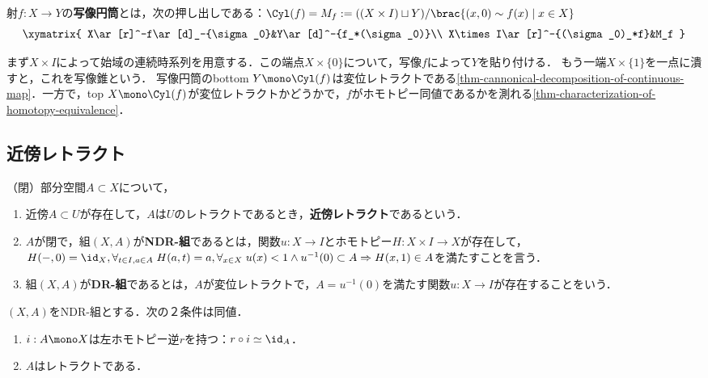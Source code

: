 \documentclass[uplatex, dvipdfmx]{jsreport}
\begin{document}
\begin{definition}
    射$f:X\to Y$の\textbf{写像円筒}とは，次の押し出しである：$\Cyl(f)=M_f:=((X\times I)\sqcup Y)/\brac{(x,0)\sim f(x)\mid x\in X}$
    \[\xymatrix{
        X\ar[r]^-f\ar[d]_-{\sigma_0}&Y\ar[d]^-{f_*(\sigma_0)}\\
        X\times I\ar[r]^-{(\sigma_0)_*f}&M_f
    }\]
\end{definition}
\begin{remarks}
    まず$X\times I$によって始域の連続時系列を用意する．この端点$X\times\{0\}$について，写像$f$によって$Y$を貼り付ける．
    もう一端$X\times\{1\}$を一点に潰すと，これを写像錐という．
    写像円筒のbottom $Y\mono\Cyl(f)$は変位レトラクトである\ref{thm-cannonical-decomposition-of-continuous-map}．一方で，top $X\mono\Cyl(f)$が変位レトラクトかどうかで，$f$がホモトピー同値であるかを測れる\ref{thm-characterization-of-homotopy-equivalence}．
\end{remarks}

\subsection{近傍レトラクト}

\begin{definition}
    （閉）部分空間$A\subset X$について，
    \begin{enumerate}
        \item 近傍$A\subset U$が存在して，$A$は$U$のレトラクトであるとき，\textbf{近傍レトラクト}であるという．
        \item $A$が閉で，組$(X,A)$が\textbf{NDR-組}であるとは，関数$u:X\to I$とホモトピー$H:X\times I\to X$が存在して，$H(-,0)=\id_X,\forall_{t\in I,a\in A}\;H(a,t)=a,\forall_{x\in X}\;u(x)<1\land u^{-1}(0)\subset A\Rightarrow H(x,1)\in A$を満たすことを言う．
        \item 組$(X,A)$が\textbf{DR-組}であるとは，$A$が変位レトラクトで，$A=u^{-1}(0)$を満たす関数$u:X\to I$が存在することをいう．
    \end{enumerate}
\end{definition}

\begin{lemma}
    $(X,A)$をNDR-組とする．次の２条件は同値．
    \begin{enumerate}
        \item $i:A\mono X$は左ホモトピー逆$r$を持つ：$r\circ i\simeq\id_A$．
        \item $A$はレトラクトである．
    \end{enumerate}
\end{lemma}
\end{document}
